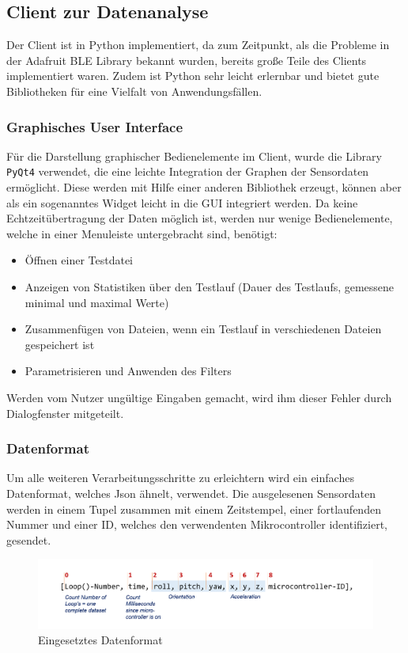 \subsection{Client zur Datenanalyse}
Der Client ist in Python implementiert, da zum Zeitpunkt, als die Probleme in der Adafruit BLE Library bekannt wurden, bereits große Teile des Clients implementiert waren. Zudem ist Python sehr leicht erlernbar und bietet gute Bibliotheken für eine Vielfalt von Anwendungsfällen.
\subsubsection{Graphisches User Interface}
Für die Darstellung graphischer Bedienelemente im Client, wurde die Library \texttt{PyQt4} verwendet, die eine leichte Integration der Graphen der Sensordaten ermöglicht. Diese werden mit Hilfe einer anderen Bibliothek erzeugt, können aber als ein sogenanntes Widget leicht in die GUI integriert werden.
Da keine Echtzeitübertragung der Daten möglich ist, werden nur wenige Bedienelemente, welche in einer Menuleiste untergebracht sind, benötigt:
\begin{itemize}
\item Öffnen einer Testdatei
\item Anzeigen von Statistiken über den Testlauf (Dauer des Testlaufs, gemessene minimal und maximal Werte)
\item Zusammenfügen von Dateien, wenn ein Testlauf in verschiedenen Dateien gespeichert ist
\item Parametrisieren und Anwenden des Filters
\end{itemize}
Werden vom Nutzer ungültige Eingaben gemacht, wird ihm dieser Fehler durch Dialogfenster mitgeteilt. 
\subsubsection{Datenformat}
Um alle weiteren Verarbeitungsschritte zu erleichtern wird ein einfaches Datenformat, welches Json ähnelt, verwendet. Die ausgelesenen Sensordaten werden in einem Tupel zusammen mit einem Zeitstempel, einer fortlaufenden Nummer und einer ID, welches den verwendenten Mikrocontroller identifiziert, gesendet.
\begin{figure}[h]
	\centering
	\includegraphics[width=1\textwidth]{images/k3-datenformat.png}
	\caption {Eingesetztes Datenformat}
	\label{fig:k3-datenformat.png} 
\end{figure}
